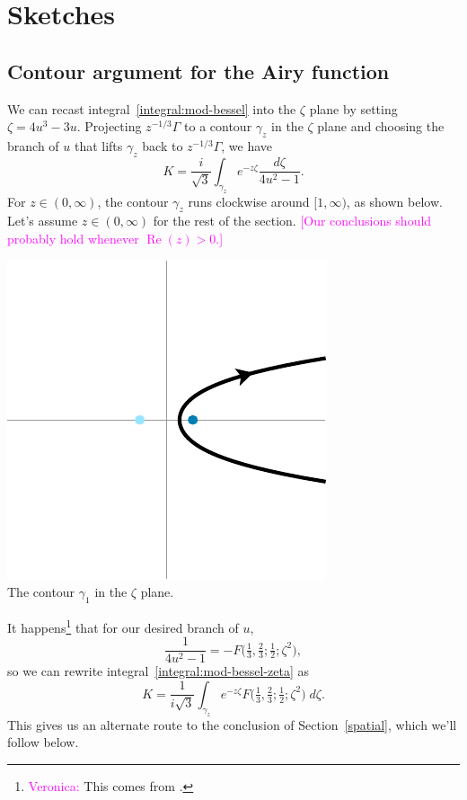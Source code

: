 \documentclass{article}
\theoremstyle{plain}
\begin{document}
\section{Sketches}
\subsection{Contour argument for the Airy function}\label{contour-argument}
We can recast integral~\ref{integral:mod-bessel} into the $\zeta$ plane by setting $\zeta = 4u^3 - 3u$. Projecting $z^{-1/3} \Gamma$ to a contour $\gamma_z$ in the $\zeta$ plane and choosing the branch of $u$ that lifts $\gamma_z$ back to $z^{-1/3} \Gamma$, we have
\begin{equation}\label{integral:mod-bessel-zeta}
K = \frac{i}{\sqrt{3}} \int_{\gamma_z} e^{-z\zeta}\frac{d\zeta}{4u^2 - 1}.
\end{equation}
For $z \in (0, \infty)$, the contour $\gamma_z$ runs clockwise around $[1, \infty)$, as shown below. Let's assume $z \in (0, \infty)$ for the rest of the section. \textcolor{magenta}{[Our conclusions should probably hold whenever $\operatorname{Re}(z) > 0$.]}
\begin{center}
\includegraphics{figures/zeta_contour_3.pdf} \\[1em]
{\small The contour $\gamma_1$ in the $\zeta$ plane.}
\end{center}

It happens\footnote{\textcolor{magenta}{Veronica:} This comes from \cite[equation~15.4.14]{dlmf}.} that for our desired branch of $u$,
\[ \frac{1}{4u^2 - 1} = -F\big(\tfrac{1}{3}, \tfrac{2}{3}; \tfrac{1}{2}; \zeta^2\big), \]
so we can rewrite integral~\ref{integral:mod-bessel-zeta} as
\[ K = \frac{1}{i\sqrt{3}} \int_{\gamma_z} e^{-z\zeta} F\big(\tfrac{1}{3}, \tfrac{2}{3}; \tfrac{1}{2}; \zeta^2\big)\;d\zeta. \]
This gives us an alternate route to the conclusion of Section~\ref{spatial}, which we'll follow below.
\end{document}
